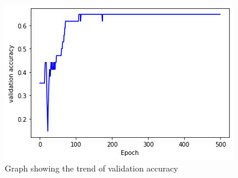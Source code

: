\documentclass[12pt,a4paper]{report}
\theoremstyle{definition}
\begin{document}
\begin{figure}[h]
    \centering
    \includegraphics[width = 0.65 \textwidth]{Images/val_accuracy.png}
    \caption{Graph showing the trend of validation accuracy}
    \label{fig:val_accuracy}
\end{figure}

\end{document}
